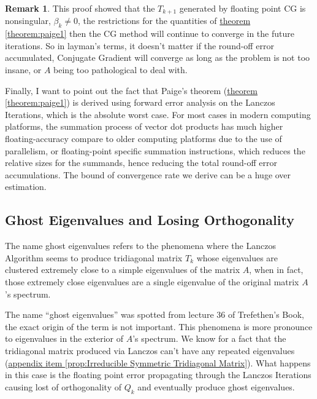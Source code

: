 \documentclass[]{article}
\theoremstyle{definition}
\newtheorem{remark}{Remark}[subsection]  %
\begin{document}
            \begin{remark}
                This proof showed that the $T_{k + 1}$ generated by floating point CG is nonsingular, $\beta_k \neq 0$, the restrictions for the quantities of \hyperref[theorem:paige1]{theorem \ref*{theorem:paige1}} then the CG method will continue to converge in the future iterations. So in layman's terms, it doesn't matter if the round-off error accumulated, Conjugate Gradient will converge as long as the problem is not too insane, or $A$ being too pathological to deal with. 
                \par
                Finally, I want to point out the fact that Paige's theorem (\hyperref[theorem:paige1]{theorem \ref*{theorem:paige1}}) is derived using forward error analysis on the Lanczos Iterations, which is the absolute worst case. For most cases in modern computing platforms, the summation process of vector dot products has much higher floating-accuracy compare to older computing platforms due to the use of parallelism, or floating-point specific summation instructions, which reduces the relative sizes for the summands, hence reducing the total round-off error accumulations. The bound of convergence rate we derive can be a huge over estimation. 
            \end{remark}

    \subsection{Ghost Eigenvalues and Losing Orthogonality}
        The name ghost eigenvalues refers to the phenomena where the Lanczos Algorithm seems to produce tridiagonal matrix $T_k$ whose eigenvalues are clustered extremely close to a simple eigenvalues of the matrix $A$, when in fact, those extremely close eigenvalues are a single eigenvalue of the original matrix $A$'s spectrum. 
        \par
        The name ``ghost eigenvalues'' was spotted from lecture 36 of Trefethen's Book\cite{book:trefethen}, the exact origin of the term is not important. This phenomena is more pronounce to eigenvalues in the exterior of $A$'s spectrum. We know for a fact that the tridiagonal matrix produced via Lanczos can't have any repeated eigenvalues (\hyperref[prop:Irreducible Symmetric Tridiagonal Matrix]{appendix item \ref*{prop:Irreducible Symmetric Tridiagonal Matrix}}). What happens in this case is the floating point error propagating through the Lanczos Iterations causing lost of orthogonality of $Q_k$ and eventually produce ghost eigenvalues. 
\end{document}
